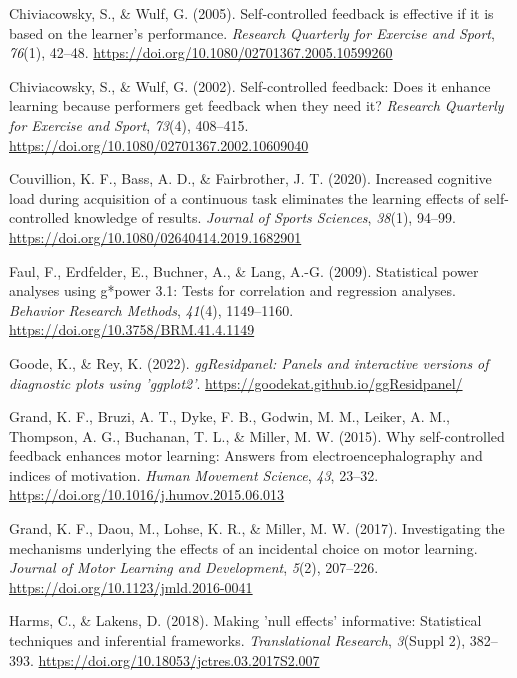 \documentclass[
  doc, donotrepeattitle,floatsintext]{apa7}
\newlength{\cslhangindent}
\newlength{\cslentryspacingunit} %
\newenvironment{CSLReferences}[2] %
 {%
  \setlength{\parindent}{0pt}
  \ifodd #1
  \let\oldpar\par
  \def\par{\hangindent=\cslhangindent\oldpar}
  \fi
  \setlength{\parskip}{#2\cslentryspacingunit}
 }%
 {}
\begin{document}
\begin{CSLReferences}{1}{0}
\leavevmode{}%
Chiviacowsky, S., \& Wulf, G. (2005). Self-controlled feedback is effective if it is based on the learner's performance. \emph{Research Quarterly for Exercise and Sport}, \emph{76}(1), 42--48. \url{https://doi.org/10.1080/02701367.2005.10599260}

\leavevmode{}%
Chiviacowsky, S., \& Wulf, G. (2002). Self-controlled feedback: {Does} it enhance learning because performers get feedback when they need it? \emph{Research Quarterly for Exercise and Sport}, \emph{73}(4), 408--415. \url{https://doi.org/10.1080/02701367.2002.10609040}

\leavevmode{}%
Couvillion, K. F., Bass, A. D., \& Fairbrother, J. T. (2020). Increased cognitive load during acquisition of a continuous task eliminates the learning effects of self-controlled knowledge of results. \emph{Journal of Sports Sciences}, \emph{38}(1), 94--99. \url{https://doi.org/10.1080/02640414.2019.1682901}

\leavevmode{}%
Faul, F., Erdfelder, E., Buchner, A., \& Lang, A.-G. (2009). Statistical power analyses using g*power 3.1: Tests for correlation and regression analyses. \emph{Behavior Research Methods}, \emph{41}(4), 1149--1160. \url{https://doi.org/10.3758/BRM.41.4.1149}

\leavevmode{}%
Goode, K., \& Rey, K. (2022). \emph{ggResidpanel: Panels and interactive versions of diagnostic plots using 'ggplot2'}. \url{https://goodekat.github.io/ggResidpanel/}

\leavevmode{}%
Grand, K. F., Bruzi, A. T., Dyke, F. B., Godwin, M. M., Leiker, A. M., Thompson, A. G., Buchanan, T. L., \& Miller, M. W. (2015). Why self-controlled feedback enhances motor learning: {Answers} from electroencephalography and indices of motivation. \emph{Human Movement Science}, \emph{43}, 23--32. \url{https://doi.org/10.1016/j.humov.2015.06.013}

\leavevmode{}%
Grand, K. F., Daou, M., Lohse, K. R., \& Miller, M. W. (2017). Investigating the mechanisms underlying the effects of an incidental choice on motor learning. \emph{Journal of Motor Learning and Development}, \emph{5}(2), 207--226. \url{https://doi.org/10.1123/jmld.2016-0041}

\leavevmode{}%
Harms, C., \& Lakens, D. (2018). Making 'null effects' informative: Statistical techniques and inferential frameworks. \emph{Translational Research}, \emph{3}(Suppl 2), 382--393. \url{https://doi.org/10.18053/jctres.03.2017S2.007}


\end{CSLReferences}
\end{document}
